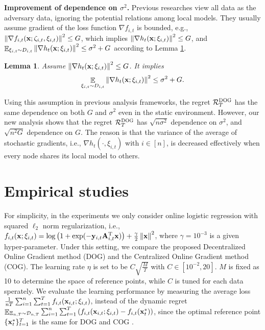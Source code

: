 \documentclass{article}
\newtheorem{Lemma}{\bf{Lemma}}
\begin{document}
\textbf{Improvement of dependence on $\sigma^2$.} Previous researches \citep{8015179Shahram,pmlr-v70-zhang17g,tcns-7353155} view all data as the adversary data, ignoring the potential relations among local models. They usually assume gradient of the loss function $\nabla f_{i,t}$ is bounded, e.g., $\left\lVert\nabla f_{i,t}({\bf x};\zeta_{i,t},\xi_{i,t})\right\rVert^2 \le G$, which implies $\left\lVert\nabla h_t({\bf x};\xi_{i,t})\right\rVert^2 \le G$, and $\mathop{\mathbb{E}}_{ \xi_{i,t} \sim D_{i,t} }\left\lVert\nabla h_t({\bf x};\xi_{i,t})\right\rVert^2  \le  \sigma^2 + G$ according to Lemma \ref{lemma_assumption_discussion}.  
\begin{Lemma}
\label{lemma_assumption_discussion}
Assume $\left\lVert\nabla h_t({\bf x};\xi_{i,t})\right\rVert^2 \le G$. It implies
\begin{align}
\nonumber
\mathop{\mathbb{E}}_{ \xi_{i,t} \sim D_{i,t} }\left\lVert\nabla h_t({\bf x};\xi_{i,t})\right\rVert^2  \le  \sigma^2 + G.
\end{align}
\end{Lemma} Using this assumption in previous analysis frameworks, the regret ${\mathcal{R}}_T^{\textsc{DOG}}$ has the same dependence on both $G$ and $\sigma^2$ even in the static environment. However, our  new analysis shows that the regret ${\mathcal{R}}_T^{\textsc{DOG}}$ has  $\sqrt{n\sigma^2}$ dependence on $\sigma^2$, and $\sqrt{n^2 G}$ dependence on $G$. The reason is that the variance of the average of stochastic gradients, i.e., $\nabla h_t(\cdot, \xi_{i,t})$ with $i\in[n]$, is decreased effectively when every node shares its local model to others. 

 














\section{Empirical studies}


For simplicity, in the experiments we only consider online logistic regression with squared $\ell_2$ norm regularization, i.e., $f_{i,t}({\bf x};\xi_{i,t}) = \log\left( 1+\exp(-{\bf y}_{i,t}{\bf A}_{i,t}^{\rm T} {\bf x}) \right) + \frac{\gamma}{2}\left\lVert{\bf x}\right\rVert^2$, where $\gamma = 10^{-3}$ is a given hyper-parameter. Under this setting, we compare the proposed Decentralized Online Gradient method (DOG) and the Centralized Online Gradient method (COG). 
The learning rate $\eta$ is set to be $C\sqrt{\frac{M}{T}}$ with  $C\in[10^{-2}, 20]$. $M$ is fixed as 10 to determine the space of reference points, while $C$ is tuned for each data sperately. We evaluate the learning performance by measuring the average loss $\frac{1}{nT}\sum_{i=1}^n\sum_{t=1}^T f_{i,t}({\bf x}_{i,t};\xi_{i,t})$, instead of the dynamic regret $\mathop{\mathbb{E}}_{\Xi_{n,T}\sim \mathcal{D}_{n,T}}\sum_{i=1}^n\sum_{t=1}^T \left(  f_{i,t}({\bf x}_{i,t};\xi_{i,t}) - f_{i,t}({\bf x}_t^{\ast})  \right)$, since the optimal reference point $\{{\bf x}_t^\ast\}^T_{t=1}$ is the same for DOG and COG .  
\end{document}
